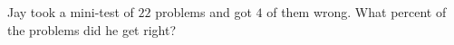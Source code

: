 Jay took a mini-test of $22$ problems and got $4$ of them wrong. What percent of the problems did he get right?
